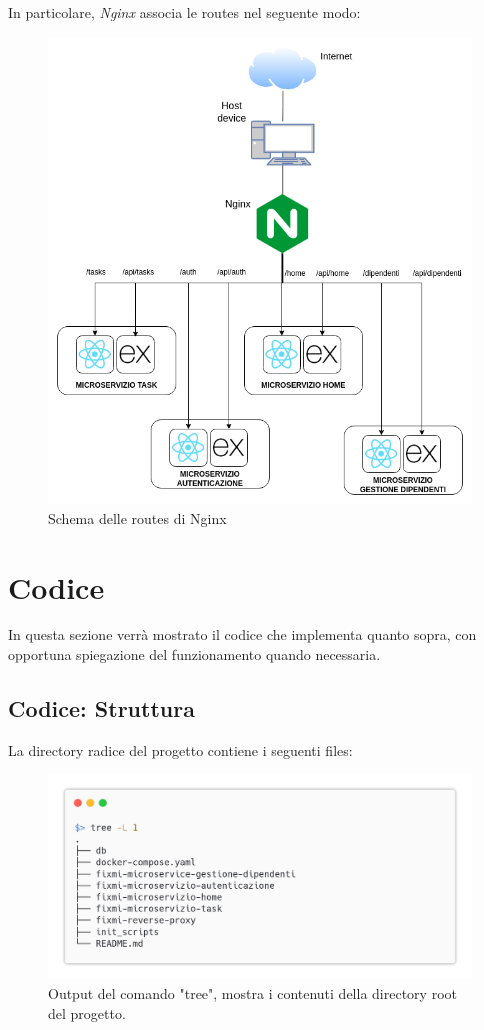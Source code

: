 \documentclass{report}
\begin{document}
In particolare, \textit{Nginx} associa le routes nel seguente modo:
\begin{figure}[H]
	\centering\includegraphics[width=1\textwidth]{images/nginx.png}
	Schema delle routes di Nginx
\end{figure}

\section{Codice}
In questa sezione verrà mostrato il codice che implementa quanto sopra, con opportuna spiegazione del funzionamento quando necessaria.

\subsection{Codice: Struttura}

La directory radice del progetto contiene i seguenti files:

\begin{figure}[H]
	\centering\includegraphics[width=1\textwidth]{images/tree.png}
    Output del comando "tree", mostra i contenuti della directory root del progetto.
\end{figure}
\end{document}
